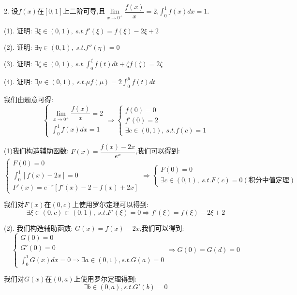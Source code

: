 2. 设$f(x)$在$[0,1]$上二阶可导,且$\lim\limits_{x\to 0^{+}}\dfrac{f(x)}{x}=2$,$\int_{0}^{1}f(x)dx=1$.

(1). 证明:  $\exists \xi\in(0,1),\ s.t. f'(\xi)=f(\xi)-2\xi+2$

(2). 证明:  $\exists \eta\in(0,1),\ s.t. f''(\eta)=0$

(3). 证明:  $\exists \zeta\in(0,1),\ s.t. \int_{0}^{\zeta}f(t)dt+\zeta f(\zeta)=2\zeta$

(4). 证明:  $\exists \mu\in(0,1),\ s.t. \mu f(\mu)=2\int_{0}^{\mu}f(t)dt$
\begin{solution}

	我们由题意可得:  
	$$\left\lbrace
	\begin{array}{l}
		\lim\limits_{x\to 0^{+}}\dfrac{f(x)}{x}=2\\
		\int_{0}^{1}f(x)dx=1
	\end{array}
	\right. \Rightarrow \left\lbrace
	\begin{array}{l}
		f(0)=0\\
		f'(0)=2\\
		\exists c\in(0,1),\ s.t. f(c)=1
	\end{array}
	\right. $$
	
	(1)我们构造辅助函数:  $F(x)=\dfrac{f(x)-2x}{e^x}$,我们可以得到:  
	$$\left\lbrace
	\begin{array}{l}
		F(0)=0\\
		\int_{0}^{1}[f(x)-2x]=0\\
		F'(x)=e^{-x}[f'(x)-2-f(x)+2x]
	\end{array}
	\right. \Rightarrow \left\lbrace
	\begin{array}{l}
		F(0)=0\\
		\exists c\in(0,1),\ s.t. F(c)=0(\text{积分中值定理})
	\end{array}
	\right. $$
	
	我们对$F(x)$在$(0,c)$上使用罗尔定理可以得到:  
	$$\exists \xi\in(0,c)\subset(0,1),\ s.t. F'(\xi)=0\Rightarrow f'(\xi)=f(\xi)-2\xi+2$$
	
	(2). 我们构造辅助函数:  $G(x)=f(x)-2x$,我们可以得到:  
	$$\left\lbrace
	\begin{array}{l}
		G(0)=0\\
		G'(0)=0\\
		\int_{0}^{1}G(x)dx=0\Rightarrow \exists a\in(0,1),s.t. G(a)=0
	\end{array}
	\right. \Rightarrow G(0)=G(d)=0$$
	
	我们对$G(x)$在$(0,a)$上使用罗尔定理得到:  
	$$\exists b\in(0,a),s.t. G'(b)=0$$
	

\end{solution}
